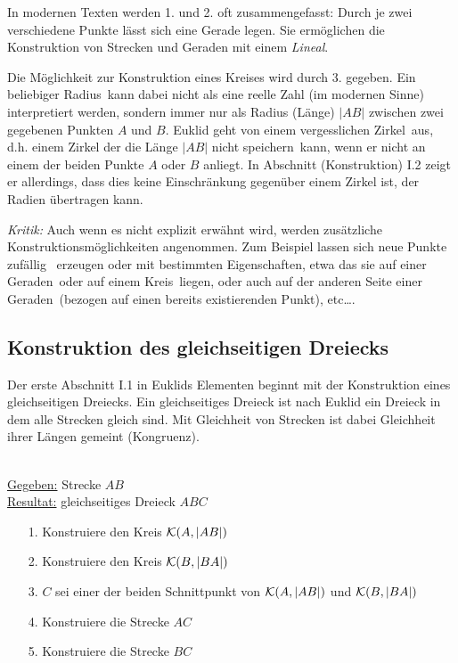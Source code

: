 In modernen Texten werden 1. und 2. oft zusammengefasst:
Durch je zwei verschiedene Punkte lässt sich eine Gerade legen.
Sie ermöglichen die Konstruktion von Strecken und Geraden mit einem
{\em Lineal}.

Die Möglichkeit zur Konstruktion eines Kreises wird durch 3. gegeben.
Ein \glqq beliebiger Radius\grqq\ kann dabei nicht als eine reelle Zahl (im
modernen Sinne) interpretiert werden, sondern immer nur als Radius
(Länge) $|AB|$
zwischen zwei gegebenen Punkten $A$ und $B$. Euklid geht von einem 
\glqq vergesslichen Zirkel\grqq\ aus, d.h. einem Zirkel der die Länge
$|AB|$
nicht \glqq speichern\grqq\ kann, wenn er nicht an einem der beiden
Punkte $A$ oder $B$ anliegt. In Abschnitt (Konstruktion) I.2 zeigt er
allerdings, dass dies keine Einschränkung gegenüber einem Zirkel ist,
der Radien übertragen kann.


{\em Kritik:}
Auch wenn es nicht explizit erwähnt wird, werden 
zusätzliche Konstruktionsmöglichkeiten angenommen.
Zum Beispiel lassen sich neue Punkte \glqq zufällig \grqq\ erzeugen
oder mit bestimmten Eigenschaften, etwa das sie \glqq auf einer Geraden\grqq\ oder
\glqq auf einem Kreis\grqq\ liegen, oder auch \glqq auf der anderen
Seite einer Geraden\grqq\ (bezogen auf einen bereits existierenden
Punkt), etc\ldots.



\subsection*{Konstruktion des gleichseitigen Dreiecks}

Der erste Abschnitt I.1 in Euklids Elementen beginnt mit der 
Konstruktion eines gleichseitigen Dreiecks.
Ein gleichseitiges Dreieck ist nach Euklid ein Dreieck in dem alle
Strecken \glqq gleich sind\grqq . Mit Gleichheit von Strecken ist
dabei Gleichheit ihrer Längen gemeint (Kongruenz).



\begin{konst}
\phantom{Pups}\hspace*{1cm}\phantom{Pups}\\
\underline{Gegeben:} Strecke $AB$ \\ 
\underline{Resultat:} gleichseitiges Dreieck $ABC$
\begin{enumerate}
\item[1.] Konstruiere den Kreis ${\mathcal K}(A,|AB|)$
\item[2.] Konstruiere den Kreis ${\mathcal K}(B,|BA|)$
\item[3.] $C$ sei einer der beiden Schnittpunkt von ${\mathcal K}(A,|AB|)$ und ${\mathcal K}(B,|BA|)$
\item[4.] Konstruiere die Strecke $AC$
\item[5.] Konstruiere die Strecke $BC$
\end{enumerate}
\end{konst}




